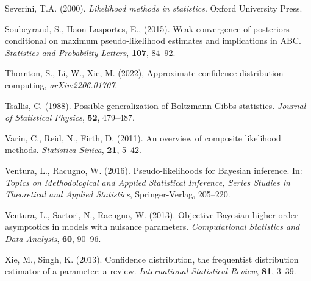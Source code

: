 \documentclass[preprint,12pt,authoryear]{elsarticle}
\begin{document}
\begin{description}
\item
Severini, T.A. (2000). {\em Likelihood methods in statistics}. Oxford University Press.
\item
Soubeyrand, S., Haon-Lasportes, E., (2015). Weak convergence of posteriors conditional on maximum pseudo-likelihood estimates and implications in
ABC. {\em Statistics and Probability Letters}, {\bf 107}, 84--92.
\item
Thornton, S., Li, W., Xie, M. (2022), Approximate confidence distribution computing, {\em 	arXiv:2206.01707}.
\item
Tsallis, C. (1988). Possible generalization of Boltzmann-Gibbs statistics. {\em Journal of Statistical Physics}, {\bf 52}, 479--487.
\item
Varin, C., Reid, N., Firth, D. (2011). An overview of composite likelihood methods. {\em Statistica Sinica}, {\bf 21}, 5--42.
\item
Ventura, L., Racugno, W. (2016). Pseudo-likelihoods for Bayesian inference. In: {\em Topics on Methodological and Applied Statistical Inference, Series Studies in Theoretical and Applied Statistics}, Springer-Verlag, 205--220.
\item
Ventura, L., Sartori, N., Racugno, W. (2013). Objective Bayesian higher-order asymptotics in models with nuisance parameters. {\em Computational Statistics and Data Analysis}, {\bf 60}, 90--96.
\item
Xie, M., Singh, K. (2013). Confidence distribution, the frequentist distribution estimator of a parameter: a review. {\em International Statistical Review}, {\bf 81}, 3--39.
\end{description}
\end{document}
